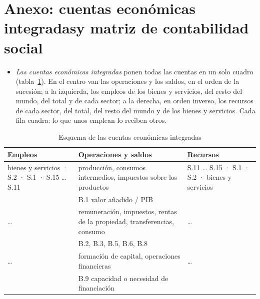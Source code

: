 \documentclass[11pt]{article}
\begin{document}
\section{Anexo: cuentas económicas integradas\cortetitulo y matriz de contabilidad social}\label{anexo:cei}

\begin{itemize}
\item \emph{Las cuentas económicas integradas} ponen todas las cuentas en un solo cuadro (tabla~\ref{tab:cei}). En el centro van las operaciones y los saldos, en el orden de la sucesión; a la izquierda, los empleos de los bienes y servicios, del resto del mundo, del total y de cada sector; a la derecha, en orden inverso, los recursos de cada sector, del total, del resto del mundo y de los bienes y servicios. Cada fila cuadra: lo que unos emplean lo reciben otros\nocite{SEC2010}.
\end{itemize}

\begin{table}[H]
\centering
\caption{Esquema de las cuentas económicas integradas}\label{tab:cei}
\small
\setlength{\tabcolsep}{3pt}
\begin{tabular}{>{\centering\arraybackslash}m{2.6cm}>{\centering\arraybackslash}m{4.2cm}>{\centering\arraybackslash}m{2.6cm}}
\toprule
\rowcolor{tceeazulpalido}
\textbf{Empleos} & \textbf{Operaciones y saldos} & \textbf{Recursos}\\
\midrule
bienes y servicios · S.2 · S.1 · S.15 \dots{} S.11 & producción, consumos intermedios, impuestos sobre los productos & S.11 \dots{} S.15 · S.1 · S.2 · bienes y servicios\\
\rowcolor{tceesalvia} & B.1 valor añadido / PIB & \\
\dots & remuneración, impuestos, rentas de la propiedad, transferencias, consumo & \dots\\
\rowcolor{tceesalvia} & B.2, B.3, B.5, B.6, B.8 & \\
\dots & formación de capital, operaciones financieras & \dots\\
\rowcolor{tceesalvia} & B.9 capacidad o necesidad de financiación & \\
\bottomrule
\end{tabular}
\end{table}
\end{document}

